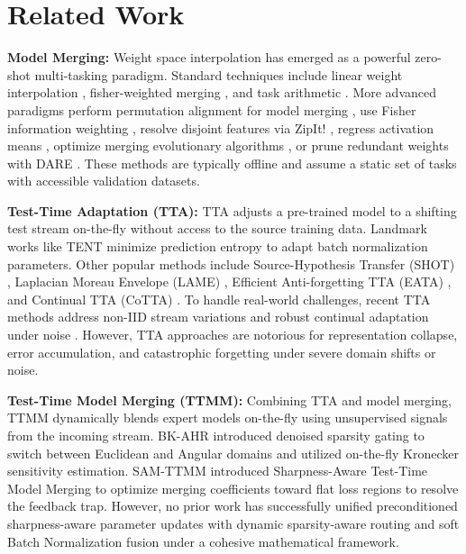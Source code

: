 \documentclass{article}
\theoremstyle{plain}
\theoremstyle{definition}
\theoremstyle{remark}
\begin{document}
\section{Related Work}
\label{sec:related}
\textbf{Model Merging:} Weight space interpolation has emerged as a powerful zero-shot multi-tasking paradigm. Standard techniques include linear weight interpolation \cite{wortsman22soups}, fisher-weighted merging \cite{yadav2023ties}, and task arithmetic \cite{ilharco2023editing}. More advanced paradigms perform permutation alignment for model merging \cite{ainsworth2022git}, use Fisher information weighting \cite{matena2022merging}, resolve disjoint features via ZipIt! \cite{stoica2023zipit}, regress activation means \cite{jin2023regmean}, optimize merging evolutionary algorithms \cite{akiba2024evolutionary}, or prune redundant weights with DARE \cite{yu2024dare}. These methods are typically offline and assume a static set of tasks with accessible validation datasets.

\textbf{Test-Time Adaptation (TTA):} TTA adjusts a pre-trained model to a shifting test stream on-the-fly without access to the source training data. Landmark works like TENT \cite{wang2021tent} minimize prediction entropy to adapt batch normalization parameters. Other popular methods include Source-Hypothesis Transfer (SHOT) \cite{liang2020we}, Laplacian Moreau Envelope (LAME) \cite{boudiaf2022lame}, Efficient Anti-forgetting TTA (EATA) \cite{niu2022efficient}, and Continual TTA (CoTTA) \cite{wang2022continual}. To handle real-world challenges, recent TTA methods address non-IID stream variations \cite{gong2022note} and robust continual adaptation under noise \cite{niu2023towards}. However, TTA approaches are notorious for representation collapse, error accumulation, and catastrophic forgetting under severe domain shifts or noise.

\textbf{Test-Time Model Merging (TTMM):} Combining TTA and model merging, TTMM dynamically blends expert models on-the-fly using unsupervised signals from the incoming stream. BK-AHR \cite{anonymous2026bkahr} introduced denoised sparsity gating to switch between Euclidean and Angular domains and utilized on-the-fly Kronecker sensitivity estimation. SAM-TTMM \cite{anonymous2026samttmm} introduced Sharpness-Aware Test-Time Model Merging to optimize merging coefficients toward flat loss regions to resolve the feedback trap. However, no prior work has successfully unified preconditioned sharpness-aware parameter updates with dynamic sparsity-aware routing and soft Batch Normalization fusion under a cohesive mathematical framework.
\end{document}

